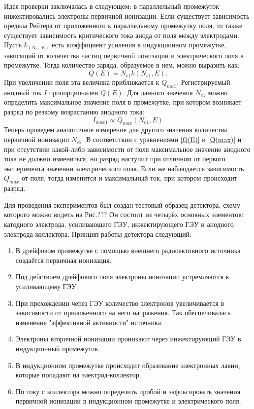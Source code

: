 \par Идея проверки заключалась в следующем: в параллельный промежуток инжектировались электроны первичной ионизации. Если существует зависимость предела Рейтера от приложенного к параллельному промежутку поля, то также существует зависимость критического тока анода от поля между электродами. Пусть $k_(N_{e1},E)$ есть коэффициент усиления в индукционном промежутке, зависящий от количества частиц первичной ионизации и электрического поля в промежутке. Тогда количество заряда, образуемое в нем, можно выразить как: 
\begin{equation}
Q(E) = N_{e1} k(N_{e1},E).
\label{Q(E)}
\end{equation}
При увеличении поля эта величина приближается к $Q_{max}$. Регистрируемый анодный ток $I$ пропорционален $Q(E)$. Для данного значения $N_{e1}$ можно определить максимальное значение поля в промежутке, при котором возникает разряд по резкому возрастанию анодного тока:
\begin{equation}
 I_{max1} \propto Q_{max}(N_{e1},E)
\end{equation}
Теперь проведем аналогичное измерение для другого значения количества первичной ионизации $N_{e2}$. В соответствии с уравнениями \ref{Q(E)} и \ref{Q(max)} и при отсутствии какой-либо зависимости от поля максимальное значение анодного тока не должно измениться, но разряд наступит при отличном от первого эксперимента значении электрического поля. Если же наблюдается зависимость $Q_{max}$ от поля, тогда изменится и максимальный ток, при котором происходит разряд.
\par Для проведения экспериментов был создан тестовый образец детектора, схему которого можно видеть на Рис.??? Он состоит из четырёх основных элементов: катодного электрода, усиливающего ГЭУ, инжектирующего ГЭУ и анодного электрода-коллектора. Принцип работы детектора следующий: 
\begin{enumerate}
	\item В дрейфовом промежутке с помощью внешнего радиоактивного источника создаётся первичная ионизация.
	\item Под действием дрейфового поля электроны ионизации устремляются к усиливающему ГЭУ.
	\item При прохождении через ГЭУ количество электронов увеличивается в зависимости от приложенного на него напряжения. Так обеспечивалась изменение "эффективной активности" источника.  
	\item Электроны вторичной ионизации проникают через инжектирующий ГЭУ в индукционный промежуток. 
	\item В индукционном промежутке происходит образование электронных лавин, которые попадают на электрод-коллектор. 
	\item По току с коллектора можно определить пробой и зафиксировать значения первичной ионизации в индукционном промежутке и электрического поля. 	
\end{enumerate}
